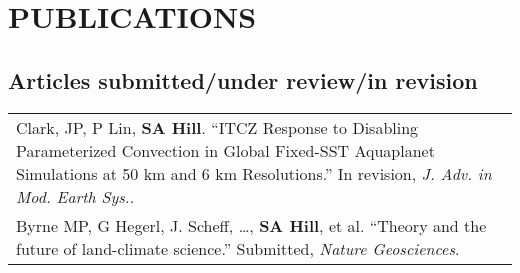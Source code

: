 \documentclass[letterpaper,11pt]{shillcv}
\begin{document}
\section*{PUBLICATIONS}

\subsection*{Articles submitted/under review/in revision}
\begin{longtable}{@{} L{\textwidth} @{}}
Clark, JP, P Lin, \textbf{SA Hill}. ``ITCZ Response to Disabling Parameterized Convection in Global Fixed-SST Aquaplanet Simulations at 50 km and 6 km Resolutions.'' In revision, \emph{J.  Adv. in Mod. Earth Sys.}.\\
Byrne MP, G Hegerl, J. Scheff, \ldots, \textbf{SA Hill}, et al. ``Theory and the future of land-climate science.''  Submitted, \emph{Nature Geosciences}.\\
\end{longtable}
\end{document}
